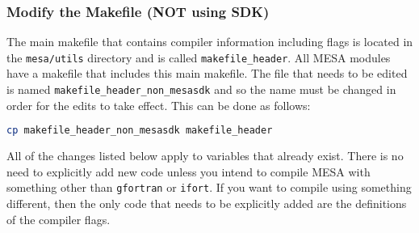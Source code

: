 \subsubsection{Modify the Makefile (NOT using SDK)}
The main makefile that contains compiler information including flags is 
located in the {\tt mesa/utils} directory and is called 
{\tt makefile\_header}. All {\sf MESA} modules have a makefile that 
includes this main makefile. The file that needs to be edited is named 
{\tt makefile\_header\_non\_mesasdk} and so the name must be changed in order 
for the edits to take effect. This can be done as follows:
\begin{lstlisting}[language=bash,mathescape=false]
  cp makefile_header_non_mesasdk makefile_header
\end{lstlisting}

All of the changes listed below apply to variables that already exist. 
There is no need to explicitly add new code 
unless you intend to compile {\sf MESA} with something other than 
{\tt gfortran} or {\tt ifort}. If you want to compile using something 
different, then the only code that needs to be explicitly added are the 
definitions of the compiler flags. 

